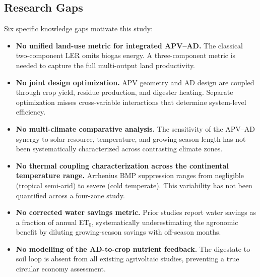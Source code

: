 \subsection{Research Gaps}

\hspace{1cm}Six specific knowledge gaps motivate this study:

\begin{itemize}[leftmargin=*, label=\textbf{G\arabic*:}]

    \item \textbf{No unified land-use metric for integrated APV--AD.}
    The classical two-component LER omits biogas energy. A three-component
    metric is needed to capture the full multi-output land productivity.

    \item \textbf{No joint design optimization.}
    APV geometry and AD design are coupled through crop yield, residue
    production, and digester heating. Separate optimization misses
    cross-variable interactions that determine system-level efficiency.

    \item \textbf{No multi-climate comparative analysis.}
    The sensitivity of the APV--AD synergy to solar resource, temperature,
    and growing-season length has not been systematically characterized
    across contrasting climate zones.

    \item \textbf{No thermal coupling characterization across the
    continental temperature range.}
    Arrhenius BMP suppression ranges from negligible (tropical semi-arid)
    to severe (cold temperate). This variability has not been quantified
    across a four-zone study.

    \item \textbf{No corrected water savings metric.}
    Prior studies report water savings as a fraction of annual ET$_0$,
    systematically underestimating the agronomic benefit by diluting
    growing-season savings with off-season months.

    \item \textbf{No modelling of the AD-to-crop nutrient feedback.}
    The digestate-to-soil loop is absent from all existing agrivoltaic
    studies, preventing a true circular economy assessment.

\end{itemize}

